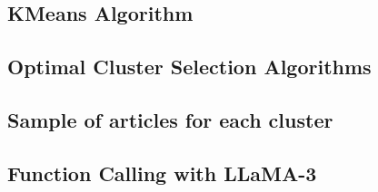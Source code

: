 \subsection{KMeans Algorithm}

%

\newpage


\newpage
\subsection{Optimal Cluster Selection Algorithms}








\subsection{Sample of articles for each cluster}
\setcounter{table}{0}
\renewcommand{\thetable}{A\arabic{table}} %








\subsection{Function Calling with LLaMA-3}



